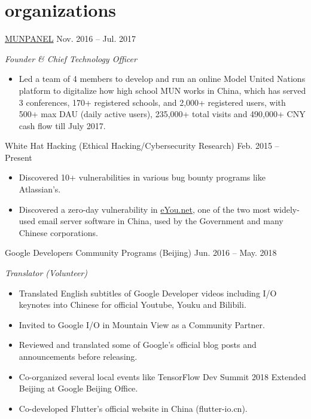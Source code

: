 \documentclass[hidelinks__VERSION__]{adamyi-cv}
\begin{document}


\section{organizations}

\begin{entrylist}


\entry
{\href{https://www.munpanel.com}{MUNPANEL}}
{Nov. 2016 -- Jul. 2017}
{\emph{Founder \& Chief Technology Officer}
\begin{itemize}
\item Led a team of 4 members to develop and run an online Model United Nations platform to digitalize how high school MUN works in China, which has served 3 conferences, 170+ registered schools, and 2,000+ registered users, with 500+ max DAU (daily active users), 235,000+ total visits and 490,000+ CNY cash flow till July 2017.
\end{itemize}}


\entry
{White Hat Hacking (Ethical Hacking/Cybersecurity Research)}
{Feb. 2015 -- Present}
{\begin{itemize}
\item Discovered 10+ vulnerabilities in various bug bounty programs like Atlassian's.
\item Discovered a zero-day vulnerability in \href{https://www.eyou.net/}{eYou.net}, one of the two most widely-used email server software in China, used by the Government and many Chinese corporations.
\end{itemize}}


\entry
{Google Developers Community Programs (Beijing)}
{Jun. 2016 -- May. 2018}
{\emph{Translator (Volunteer)}
\begin{itemize}
\item Translated English subtitles of Google Developer videos including I/O keynotes into Chinese for official Youtube, Youku and Bilibili.
\item Invited to Google I/O in Mountain View as a Community Partner.
\item Reviewed and translated some of Google's official blog posts and announcements before releasing.
\item Co-organized several local events like TensorFlow Dev Summit 2018 Extended Beijing at Google Beijing Office.
\item Co-developed Flutter's official website in China (flutter-io.cn).
\end{itemize}}


\end{entrylist}
\end{document}
